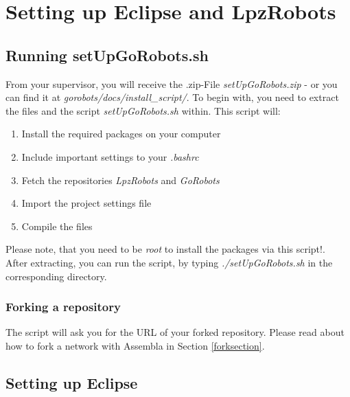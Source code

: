 \section{Setting up Eclipse and LpzRobots}

\subsection{Running setUpGoRobots.sh}
From your supervisor, you will receive the .zip-File \emph{setUpGoRobots.zip} - or you can find it at \emph{gorobots/docs/install\_script/}. To begin with, you need to extract the files and the script \emph{setUpGoRobots.sh} within.
This script will:
\begin{enumerate}
 \item Install the required packages on your computer
 \item Include important settings to your \emph{.bashrc}
 \item Fetch the repositories \emph{LpzRobots} and \emph{GoRobots}
 \item Import the project settings file
 \item Compile the files
\end{enumerate}
Please note, that you need to be \emph{root} to install the packages via this script!.\\
After extracting, you can run the script, by typing \emph{./setUpGoRobots.sh} in the corresponding directory.

\subsubsection{Forking a repository}
The script will ask you for the URL of your forked repository. Please read about how to fork a network with Assembla in Section \ref{forksection}.

\subsection{Setting up Eclipse}

